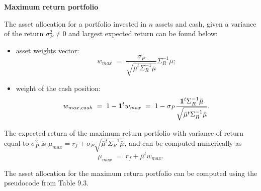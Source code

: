 
\noindent\textbf{Maximum return portfolio}

The asset allocation for a portfolio invested in $n$ assets and cash, given a variance
of the return $\sigma_P^2 \ne 0$ and largest expected return can be found below:
\begin{itemize}
\item asset weights vector:
\begin{equation}
w_{max} \;=\; \frac{\sigma_P}{\sqrt{\bar\mu^t\Sigma_R^{-1}\bar\mu}}\Sigma_R^{-1}\bar\mu;
\end{equation}
\item weight of the cash position:
\begin{equation}
w_{max,cash} \;=\; 1-\mathbf{1}^tw_{max} \;=\;
1-\sigma_P\frac{\mathbf{1}^t\Sigma_R^{-1}\bar\mu}{\sqrt{\bar\mu^t\Sigma_R^{-1}\bar\mu}}.
\end{equation}
\end{itemize}

The expected return of the maximum return portfolio with variance of return equal to
$\sigma_P^2$ is $\mu_{max} = r_f+\sigma_P\sqrt{\bar\mu^t\Sigma_R^{-1}\bar\mu}$, and can
be computed numerically as
\[
\mu_{max} \;=\; r_f+\bar\mu^tw_{max}.
\]

The asset allocation for the maximum return portfolio can be computed using the
pseudocode from Table 9.3.

\begin{table}[H]
\centering
\caption{Pseudocode for asset allocation of maximum return portfolio}
\end{table}
